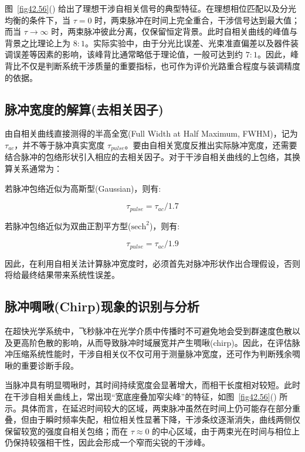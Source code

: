图~\ref{fig42.56}() 给出了理想干涉自相关信号的典型特征。在理想相位匹配以及分光均衡的条件下，当 $\tau=0$ 时，两束脉冲在时间上完全重合，干涉信号达到最大值；而当 $\tau \rightarrow \infty$ 时，两束脉冲彼此分离，仅保留恒定背景。此时自相关曲线的峰值与背景之比理论上为 $8:1$。实际实验中，由于分光比误差、光束准直偏差以及器件装调误差等因素的影响，该峰背比通常略低于理论值，一般可达到约 $7:1$。因此，峰背比不仅是判断系统干涉质量的重要指标，也可作为评价光路重合程度与装调精度的依据。

\subsection{脉冲宽度的解算(去相关因子)}\label{6.1.2}

由自相关曲线直接测得的半高全宽(Full Width at Half Maximum, FWHM)，记为 $\tau_{ac}$，并不等于脉冲真实宽度 $\tau_{pulse}$。要由自相关宽度反推出实际脉冲宽度，还需要结合脉冲的包络形状引入相应的去相关因子。对于干涉自相关曲线的上包络，其换算关系通常为：

若脉冲包络近似为高斯型(Gaussian)，则有:

\begin{equation}
\tau_{pulse}=\tau_{ac}/1.7
\end{equation}

若脉冲包络近似为双曲正割平方型($\mathrm{sech}^2$)，则有:

\begin{equation}
\tau_{pulse}=\tau_{ac}/1.9
\end{equation}

因此，在利用自相关法计算脉冲宽度时，必须首先对脉冲形状作出合理假设，否则将给最终结果带来系统性误差。



\subsection{脉冲啁啾(Chirp)现象的识别与分析}\label{6.1.3}

在超快光学系统中，飞秒脉冲在光学介质中传播时不可避免地会受到群速度色散以及更高阶色散的影响，从而导致脉冲时域展宽并产生啁啾(chirp)。因此，在评估脉冲压缩系统性能时，干涉自相关仪不仅可用于测量脉冲宽度，还可作为判断残余啁啾的重要诊断手段。

当脉冲具有明显啁啾时，其时间持续宽度会显著增大，而相干长度相对较短。此时在干涉自相关曲线上，常出现``宽底座叠加窄尖峰''的特征，如图~\ref{fig42.56}() 所示。具体而言，在延迟时间较大的区域，两束脉冲虽然在时间上仍可能存在部分重叠，但由于瞬时频率失配，相位相关性显著下降，干涉条纹逐渐消失，曲线两侧仅保留较宽的强度自相关包络；而在 $\tau \approx 0$ 的中心区域，由于两束光在时间与相位上仍保持较强相干性，因此会形成一个窄而尖锐的干涉峰。

